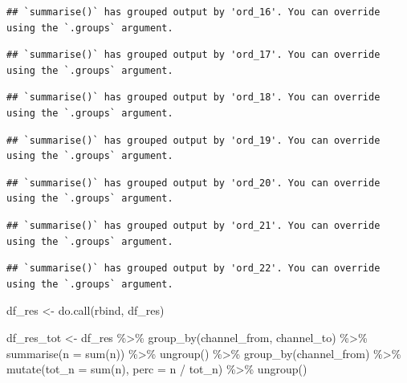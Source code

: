 \documentclass[
]{book}
\newenvironment{Shaded}{\begin{snugshade}}{\end{snugshade}}
\newcommand{\AttributeTok}[1]{\textcolor[rgb]{0.77,0.63,0.00}{#1}}
\newcommand{\FunctionTok}[1]{\textcolor[rgb]{0.00,0.00,0.00}{#1}}
\newcommand{\NormalTok}[1]{#1}
\newcommand{\OtherTok}[1]{\textcolor[rgb]{0.56,0.35,0.01}{#1}}
\newcommand{\SpecialCharTok}[1]{\textcolor[rgb]{0.00,0.00,0.00}{#1}}
\newcommand{\StringTok}[1]{\textcolor[rgb]{0.31,0.60,0.02}{#1}}
\begin{document}
\begin{verbatim}
## `summarise()` has grouped output by 'ord_16'. You can override using the `.groups` argument.
\end{verbatim}

\begin{verbatim}
## `summarise()` has grouped output by 'ord_17'. You can override using the `.groups` argument.
\end{verbatim}

\begin{verbatim}
## `summarise()` has grouped output by 'ord_18'. You can override using the `.groups` argument.
\end{verbatim}

\begin{verbatim}
## `summarise()` has grouped output by 'ord_19'. You can override using the `.groups` argument.
\end{verbatim}

\begin{verbatim}
## `summarise()` has grouped output by 'ord_20'. You can override using the `.groups` argument.
\end{verbatim}

\begin{verbatim}
## `summarise()` has grouped output by 'ord_21'. You can override using the `.groups` argument.
\end{verbatim}

\begin{verbatim}
## `summarise()` has grouped output by 'ord_22'. You can override using the `.groups` argument.
\end{verbatim}

\begin{Shaded}
\begin{Highlighting}[]
\NormalTok{df\_res }\OtherTok{\textless{}{-}} \FunctionTok{do.call}\NormalTok{(}\StringTok{\textquotesingle{}rbind\textquotesingle{}}\NormalTok{, df\_res)}
 
\NormalTok{df\_res\_tot }\OtherTok{\textless{}{-}}\NormalTok{ df\_res }\SpecialCharTok{\%\textgreater{}\%}
        \FunctionTok{group\_by}\NormalTok{(channel\_from, channel\_to) }\SpecialCharTok{\%\textgreater{}\%}
        \FunctionTok{summarise}\NormalTok{(}\AttributeTok{n =} \FunctionTok{sum}\NormalTok{(n)) }\SpecialCharTok{\%\textgreater{}\%}
        \FunctionTok{ungroup}\NormalTok{() }\SpecialCharTok{\%\textgreater{}\%}
        \FunctionTok{group\_by}\NormalTok{(channel\_from) }\SpecialCharTok{\%\textgreater{}\%}
        \FunctionTok{mutate}\NormalTok{(}\AttributeTok{tot\_n =} \FunctionTok{sum}\NormalTok{(n),}
               \AttributeTok{perc =}\NormalTok{ n }\SpecialCharTok{/}\NormalTok{ tot\_n) }\SpecialCharTok{\%\textgreater{}\%}
        \FunctionTok{ungroup}\NormalTok{()}
\end{Highlighting}
\end{Shaded}
\end{document}
